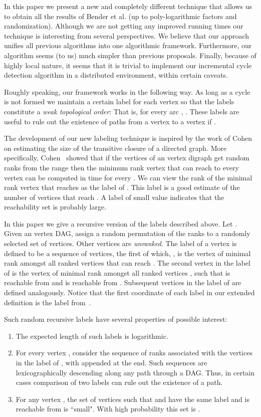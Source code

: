 \documentclass[11pt]{article}
\theoremstyle{plain}
\theoremstyle{definition}
\theoremstyle{remark}
\numberwithin{equation}{section}
\begin{document}
In this paper we present a new and completely different technique
that allows us to obtain all the results of Bender et al. (up to
poly-logarithmic factors and randomization). Although we are not
getting any improved running times our technique is interesting from
several perspectives. We believe that our approach unifies all
previous algorithms into one algorithmic framework. Furthermore, our
algorithm seems (to us) much simpler than previous proposals.
Finally, because of highly local nature, it seems that it is trivial
to implement our incremental cycle detection algorithm in a
distributed environment, within certain caveats.

Roughly speaking, our framework works in the following way. As long
as a cycle is not formed we maintain a certain label  for
each vertex  so that the labels constitute  a {\em weak
topological order}: That is, for every arc , . These labels are useful to rule out the existence of paths
from a vertex  to a vertex  if .

The development of our new labeling technique is inspired by the
work of Cohen~\cite{Cohen:1997} on estimating the size of the
transitive closure of a directed graph. More specifically,
Cohen~\cite{Cohen:1997} showed that if the vertices of an  vertex
digraph  get random ranks from the range  then the
minimum rank vertex that can reach to every vertex  can be
computed in  time for every . We can view the rank of
the minimal rank vertex that reaches  as the label of .
This label is a good estimate of the number of vertices that reach
 . A label of small value indicates that the reachability set
is probably large.

In this paper we give a recursive version of the labels described
above. Let . Given an  vertex DAG, assign a random
permutation of the ranks  to a randomly selected set of
 vertices. Other vertices are {\sl unranked}. The label of a
vertex  is defined to be a sequence of vertices, the first of
which, , is the vertex of minimal rank amongst all ranked
vertices that can reach .  The second vertex in the label of 
is the vertex of minimal rank amongst all ranked vertices , such that  is reachable from  and  is
reachable from . Subsequent vertices in the label of  are
defined analogously. Notice that the first coordinate of each label
in our extended definition is the label from~\cite{Cohen:1997}.

Such random recursive labels have several properties of possible
interest:
\begin{enumerate}
  \item The expected length of such labels is logarithmic.
\item For every vertex , consider the sequence of ranks associated with the vertices in the label of , with  appended at the end. Such sequences are lexicographically descending along any path through a DAG. Thus, in certain cases comparison of two labels can rule out the existence of a path.
\item For any vertex , the set of vertices  such that  and  have the same label and  is reachable from  is ``small". With high probability this set is .
\end{enumerate}
\end{document}
